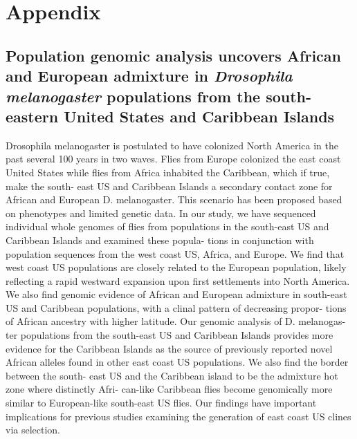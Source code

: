 \chapter{Appendix}
\label{appendix}
\section{Population genomic analysis uncovers African and European admixture in \emph{Drosophila melanogaster} populations from the south-eastern United States and Caribbean Islands \cite{kao15}}

Drosophila melanogaster is postulated to have colonized North America in the past several 100 years in two waves. Flies from Europe colonized the east coast United States while flies from Africa inhabited the Caribbean, which if true, make the south- east US and Caribbean Islands a secondary contact zone for African and European D. melanogaster. This scenario has been proposed based on phenotypes and limited genetic data. In our study, we have sequenced individual whole genomes of flies from populations in the south-east US and Caribbean Islands and examined these popula- tions in conjunction with population sequences from the west coast US, Africa, and Europe. We find that west coast US populations are closely related to the European population, likely reflecting a rapid westward expansion upon first settlements into North America. We also find genomic evidence of African and European admixture in south-east US and Caribbean populations, with a clinal pattern of decreasing propor- tions of African ancestry with higher latitude. Our genomic analysis of D. melanogas- ter populations from the south-east US and Caribbean Islands provides more evidence for the Caribbean Islands as the source of previously reported novel African alleles found in other east coast US populations. We also find the border between the south- east US and the Caribbean island to be the admixture hot zone where distinctly Afri- can-like Caribbean flies become genomically more similar to European-like south-east US flies. Our findings have important implications for previous studies examining the generation of east coast US clines via selection.

\newpage

